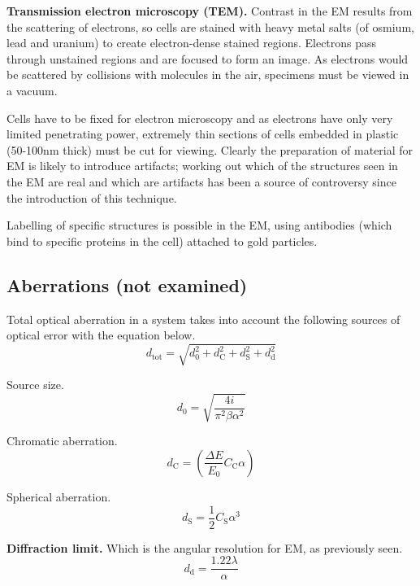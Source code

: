 \textbf{Transmission electron microscopy (TEM).} Contrast in the EM results from the scattering of electrons, so cells are stained with heavy metal salts (of osmium, lead and uranium) to create electron-dense stained regions. Electrons pass through unstained regions and are focused to form an image. As electrons would be scattered by collisions with molecules in the air, specimens must be viewed in a vacuum.

Cells have to be fixed for electron microscopy and as electrons have only very limited penetrating power, extremely thin sections of cells embedded in plastic (50-100nm thick) must be cut for viewing. Clearly the preparation of material for EM is likely to introduce artifacts; working out which of the structures seen in the EM are real and which are artifacts has been a source of controversy since the introduction of this technique.

Labelling of specific structures is possible in the EM, using antibodies (which bind to specific proteins in the cell) attached to gold particles.

\subsection*{Aberrations (not examined)}
Total optical aberration in a system takes into account the following sources of optical error with the equation below.
\begin{equation*}
    d_{\mathrm{tot}} = \sqrt{d_0^2 + d_{\mathrm{C}}^2 + d_{\mathrm{S}}^2 + d_{\mathrm{d}}^2}
\end{equation*}

Source size.
\begin{equation*}
    d_0 = \sqrt{\frac{4i}{\pi^2 \beta \alpha^2}}
\end{equation*}

Chromatic aberration.
\begin{equation*}
    d_{\mathrm{C}} = \left( \frac{\Delta E}{E_0}C_{\mathrm{C}} \alpha \right)
\end{equation*}

Spherical aberration.
\begin{equation*}
    d_{\mathrm{S}}  = \frac{1}{2} C_{\mathrm{S}} \alpha^3
\end{equation*}

\textbf{Diffraction limit.} Which is the angular resolution for EM, as previously seen.
\begin{equation*}
    d_{\mathrm{d}} = \frac{1.22 \lambda}{\alpha}
\end{equation*}{}